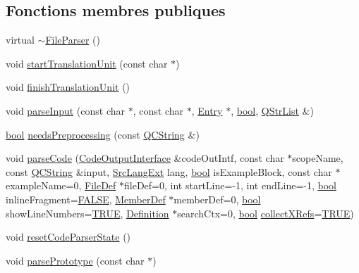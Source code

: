 \subsection*{Fonctions membres publiques}
\begin{DoxyCompactItemize}
\item 
virtual \hyperlink{class_file_parser_af9a019458a35a397f40cd8f605758948}{$\sim$\+File\+Parser} ()
\item 
void \hyperlink{class_file_parser_a4a8fa3af665adaca443c02ddd3d13d7d}{start\+Translation\+Unit} (const char $\ast$)
\item 
void \hyperlink{class_file_parser_a08ab809441600d2ace9508c040bc3943}{finish\+Translation\+Unit} ()
\item 
void \hyperlink{class_file_parser_a129994a05caded4f7bfe5d30945f008b}{parse\+Input} (const char $\ast$, const char $\ast$, \hyperlink{class_entry}{Entry} $\ast$, \hyperlink{qglobal_8h_a1062901a7428fdd9c7f180f5e01ea056}{bool}, \hyperlink{class_q_str_list}{Q\+Str\+List} \&)
\item 
\hyperlink{qglobal_8h_a1062901a7428fdd9c7f180f5e01ea056}{bool} \hyperlink{class_file_parser_acf9bb5f92915a547a6638a07e63b9100}{needs\+Preprocessing} (const \hyperlink{class_q_c_string}{Q\+C\+String} \&)
\item 
void \hyperlink{class_file_parser_aa9db12f7a11ecbd929a1998fc4ef3b3c}{parse\+Code} (\hyperlink{class_code_output_interface}{Code\+Output\+Interface} \&code\+Out\+Intf, const char $\ast$scope\+Name, const \hyperlink{class_q_c_string}{Q\+C\+String} \&input, \hyperlink{types_8h_a9974623ce72fc23df5d64426b9178bf2}{Src\+Lang\+Ext} lang, \hyperlink{qglobal_8h_a1062901a7428fdd9c7f180f5e01ea056}{bool} is\+Example\+Block, const char $\ast$example\+Name=0, \hyperlink{class_file_def}{File\+Def} $\ast$file\+Def=0, int start\+Line=-\/1, int end\+Line=-\/1, \hyperlink{qglobal_8h_a1062901a7428fdd9c7f180f5e01ea056}{bool} inline\+Fragment=\hyperlink{qglobal_8h_a10e004b6916e78ff4ea8379be80b80cc}{F\+A\+L\+S\+E}, \hyperlink{class_member_def}{Member\+Def} $\ast$member\+Def=0, \hyperlink{qglobal_8h_a1062901a7428fdd9c7f180f5e01ea056}{bool} show\+Line\+Numbers=\hyperlink{qglobal_8h_a04a6422a52070f0dc478693da640242b}{T\+R\+U\+E}, \hyperlink{class_definition}{Definition} $\ast$search\+Ctx=0, \hyperlink{qglobal_8h_a1062901a7428fdd9c7f180f5e01ea056}{bool} \hyperlink{tclscanner_8cpp_ac23b94d6976d5bb0c9f1885c5a2e7a53}{collect\+X\+Refs}=\hyperlink{qglobal_8h_a04a6422a52070f0dc478693da640242b}{T\+R\+U\+E})
\item 
void \hyperlink{class_file_parser_af8af94eb387a7ed046f52bc36d2f615a}{reset\+Code\+Parser\+State} ()
\item 
void \hyperlink{class_file_parser_a810fbf1258dcc4d4d87711499a7f7454}{parse\+Prototype} (const char $\ast$)
\end{DoxyCompactItemize}


